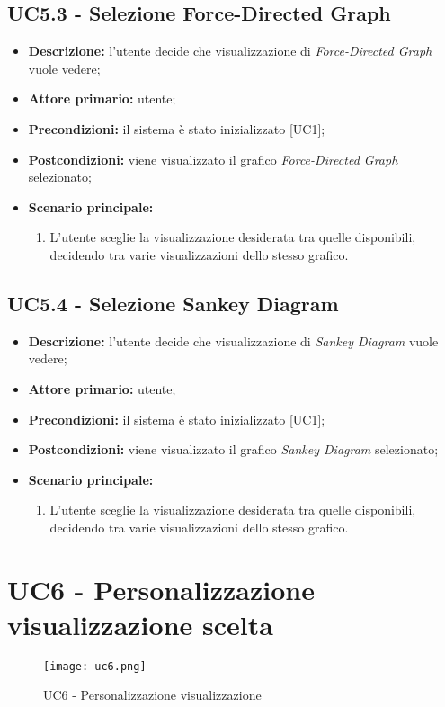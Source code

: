 \subsection{UC5.3 - Selezione Force-Directed Graph}
\begin{itemize}
    \item \textbf{Descrizione:} l'utente decide che visualizzazione di \textit{Force-Directed Graph} vuole vedere;
    \item \textbf{Attore primario:} utente;
    \item \textbf{Precondizioni:} il sistema è stato inizializzato [UC1];
    \item \textbf{Postcondizioni:} viene visualizzato il grafico \textit{Force-Directed Graph} selezionato;
    \item \textbf{Scenario principale:}
    \begin{enumerate}
      \item L'utente sceglie la visualizzazione desiderata tra quelle disponibili, decidendo tra varie visualizzazioni dello stesso grafico.
    \end{enumerate}
\end{itemize}

\subsection{UC5.4 - Selezione Sankey Diagram}
\begin{itemize}
    \item \textbf{Descrizione:} l'utente decide che visualizzazione di \textit{Sankey Diagram} vuole vedere;
    \item \textbf{Attore primario:} utente;
    \item \textbf{Precondizioni:} il sistema è stato inizializzato [UC1];
    \item \textbf{Postcondizioni:} viene visualizzato il grafico \textit{Sankey Diagram} selezionato;
    \item \textbf{Scenario principale:}
    \begin{enumerate}
      \item L'utente sceglie la visualizzazione desiderata tra quelle disponibili, decidendo tra varie visualizzazioni dello stesso grafico.
    \end{enumerate}
\end{itemize}


\section{UC6 - Personalizzazione visualizzazione scelta}
\begin{figure}[H]
  \centering
  \texttt{[image: uc6.png]}
  \caption{UC6 - Personalizzazione visualizzazione}
\end{figure}

